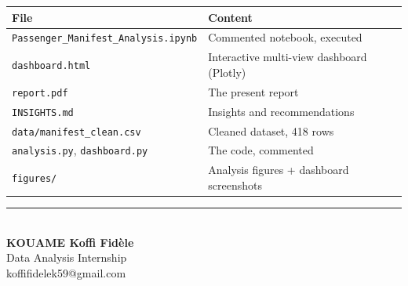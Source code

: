 \documentclass[12pt,a4paper]{article}
\begin{document}
\begin{table}[H]\centering\normalsize
\begin{tabular}{@{}ll@{}}\toprule
\textbf{File} & \textbf{Content} \\ \midrule
\texttt{Passenger\_Manifest\_Analysis.ipynb} & Commented notebook, executed \\
\texttt{dashboard.html} & Interactive multi-view dashboard (Plotly) \\
\texttt{report.pdf} & The present report \\
\texttt{INSIGHTS.md} & Insights and recommendations \\
\texttt{data/manifest\_clean.csv} & Cleaned dataset, 418 rows \\
\texttt{analysis.py}, \texttt{dashboard.py} & The code, commented \\
\texttt{figures/} & Analysis figures + dashboard screenshots \\
\bottomrule\end{tabular}\end{table}

\vspace{1cm}\noindent\rule{\linewidth}{0.4pt}\\[3pt]
{\small\textbf{KOUAME Koffi Fid\`ele}\\ Data Analysis Internship\\ koffifidelek59@gmail.com}
\end{document}
